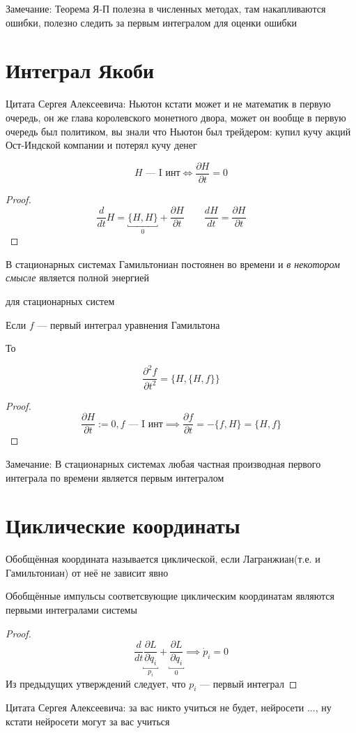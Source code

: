\documentclass[crop=false]{standalone}
\begin{document}
Замечание:
Теорема Я-П полезна в численных методах, там накапливаются ошибки, полезно следить за первым интегралом для оценки ошибки

\section{Интеграл Якоби}
\noindent \keypoint Цитата Сергея Алексеевича: Ньютон кстати может и не математик в первую очередь, он же глава королевского монетного двора, может он вообще в первую очередь был политиком, вы знали что Ньютон был трейдером: купил кучу акций Ост-Индской компании и потерял кучу денег

\noindent \keypoint
\[H \text{ — I инт} \iff \frac{\partial H}{\partial t} = 0\]
\begin{proof}
    \[\frac{d}{d t} H = \underbracket{\{H, H\}}_0 + \frac{\partial H}{\partial t} \qquad \frac{d H}{d t} = \frac{\partial H}{\partial t} \qquad \]
\end{proof}
\noindent \keypoint В стационарных системах Гамильтониан постоянен во времени и \emph{в некотором смысле} является полной энергией

\noindent \keypoint

для стационарных систем 

Если $f$ — первый интеграл уравнения Гамильтона

То

\[\frac{\partial^2 f}{\partial t^2}  = \{H, \{H, f\}\}\]
\begin{proof}
    \[\frac{\partial H}{\partial t} := 0, f \text{ — I инт} \implies \frac{\partial f}{\partial t} =-\{f, H\} = \{H, f\}\]
\end{proof}
Замечание: В стационарных системах любая частная производная первого интеграла по времени является первым интегралом
\section{Циклические координаты}
\Def Обобщённая координата называется циклической, если Лагранжиан(т.е. и Гамильтониан) от неё не зависит явно

\noindent \keypoint Обобщённые импульсы соответсвующие циклическим координатам являются первыми интегралами системы
\begin{proof}
\[\frac{d}{d t} \underbracket{\frac{\partial L}{\partial \dot q_i}}_{p_i} + \underbracket{\frac{\partial L}{\partial q_i}}_0 \implies \dot p_i = 0\]
Из предыдущих утверждений следует, что $p_i$ — первый интеграл
\end{proof}
\noindent \keypoint Цитата Сергея Алексеевича: за вас никто учиться не будет, нейросети ..., ну кстати нейросети могут за вас учиться
\end{document}
